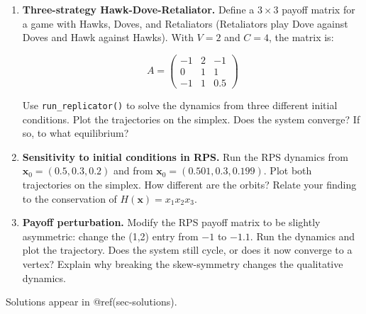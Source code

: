 \documentclass[
]{article}
\begin{document}
\begin{enumerate}
\def\labelenumi{\arabic{enumi}.}
\item
  \textbf{Three-strategy Hawk-Dove-Retaliator.} Define a \(3 \times 3\)
  payoff matrix for a game with Hawks, Doves, and Retaliators
  (Retaliators play Dove against Doves and Hawk against Hawks). With
  \(V = 2\) and \(C = 4\), the matrix is:

  \[A = \begin{pmatrix} -1 & 2 & -1 \\ 0 & 1 & 1 \\ -1 & 1 & 0.5 \end{pmatrix}\]

  Use \texttt{run\_replicator()} to solve the dynamics from three
  different initial conditions. Plot the trajectories on the simplex.
  Does the system converge? If so, to what equilibrium?
\item
  \textbf{Sensitivity to initial conditions in RPS.} Run the RPS
  dynamics from \(\mathbf{x}_0 = (0.5, 0.3, 0.2)\) and from
  \(\mathbf{x}_0 = (0.501, 0.3, 0.199)\). Plot both trajectories on the
  simplex. How different are the orbits? Relate your finding to the
  conservation of \(H(\mathbf{x}) = x_1 x_2 x_3\).
\item
  \textbf{Payoff perturbation.} Modify the RPS payoff matrix to be
  slightly asymmetric: change the (1,2) entry from \(-1\) to \(-1.1\).
  Run the dynamics and plot the trajectory. Does the system still cycle,
  or does it now converge to a vertex? Explain why breaking the
  skew-symmetry changes the qualitative dynamics.
\end{enumerate}

Solutions appear in @ref(sec-solutions).
\end{document}
